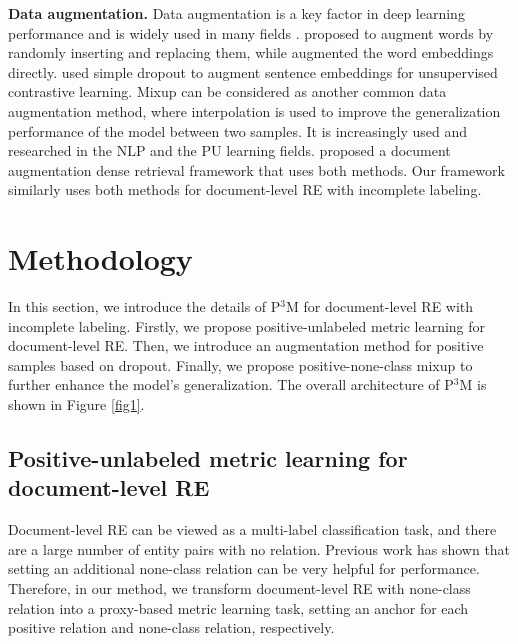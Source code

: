 \documentclass[11pt]{article}
\begin{document}
\textbf{Data augmentation.} \enspace Data augmentation is a key factor in deep learning performance and is widely used in many fields \citep{shorten2019survey,hedderich-etal-2021-survey}. \citep{wei-zou-2019-eda,ma2019nlpaug} proposed to augment words by randomly inserting and replacing them, while \citep{lee-etal-2021-learning-perturb} augmented the word embeddings directly. \citep{gao-etal-2021-simcse} used simple dropout to augment sentence embeddings for unsupervised contrastive learning. Mixup \citep{zhang2018mixup,pmlr-v97-verma19a} can be considered as another common data augmentation method, where interpolation is used to improve the generalization performance of the model between two samples. It is increasingly used and researched in the NLP \citep{chen-etal-2020-mixtext,yin-etal-2021-batchmixup,wu-etal-2022-robust} and the PU learning \citep{chen2020variational,wei2020mixpul,li2021your,zhao2022dist} fields. \citep{jeong-etal-2022-augmenting} proposed a document augmentation dense retrieval framework that uses both methods. Our framework similarly uses both methods for document-level RE with incomplete labeling.

\section{Methodology}

In this section, we introduce the details of P$^{3}$M for document-level RE with incomplete labeling. Firstly, we propose positive-unlabeled metric learning for document-level RE. Then, we introduce an augmentation method for positive samples based on dropout. Finally, we propose positive-none-class mixup to further enhance the model's generalization. The overall architecture of P$^{3}$M is shown in Figure \ref{fig1}.

\subsection{Positive-unlabeled metric learning for document-level RE}

Document-level RE can be viewed as a multi-label classification task, and there are a large number of entity pairs with no relation. Previous work \citep{ijcai2022p630,wang2022unified} has shown that setting an additional none-class relation can be very helpful for performance. Therefore, in our method, we transform document-level RE with none-class relation into a proxy-based metric learning task, setting an anchor for each positive relation and none-class relation, respectively.
\end{document}
